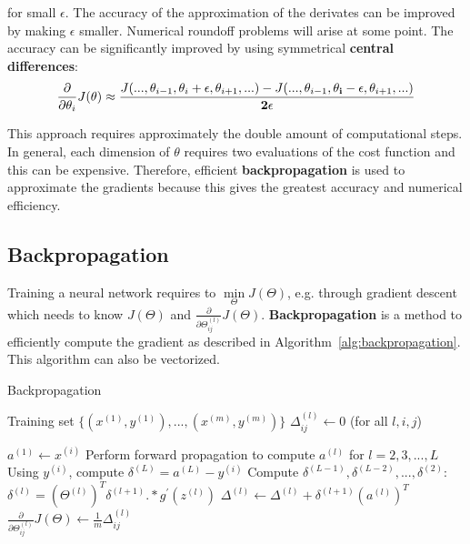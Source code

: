 \documentclass{report}
\begin{document}
for small $\epsilon$. The accuracy of the approximation of the derivates can be improved by making $\epsilon$ smaller.
Numerical roundoff problems will arise at some point.
The accuracy can be significantly improved by using symmetrical {\bf central differences}:
\begin{align*}
\frac{\partial}{\partial\theta_i}J(\theta)\approx\frac{J(...,\theta_{i-1},\theta_{i}+\epsilon,\theta_{i+1},...)-J(...,\theta_{i-1},{\bf \theta_{i}-\epsilon},\theta_{i+1},...)}{{\bf 2}\epsilon}
\end{align*}

This approach requires approximately the double amount of computational steps.
In general, each dimension of $\theta$ requires two evaluations of the cost function and this can be expensive.
Therefore, efficient {\bf backpropagation} is used to approximate the gradients because this gives the greatest accuracy and numerical efficiency.


\subsection{Backpropagation}
Training a neural network requires to $\min\limits_{\Theta}J(\Theta)$, e.g. through gradient descent which needs to know $J(\Theta)$ and $\frac{\partial}{\partial \Theta_{ij}^{(l)}}J(\Theta)$.
{\bf Backpropagation} is a method to efficiently compute the gradient as described in Algorithm~\ref{alg:backpropagation}. This algorithm can also be vectorized.

\begin{algorithm}[h!]
\caption{Backpropagation}
\label{alg:backpropagation}
\begin{algorithmic}
\State Training set $\{(x^{(1)},y^{(1)}),...,(x^{(m)},y^{(m)})\}$
\State $\Delta_{ij}^{(l)} \gets 0$ (for all $l,i,j$)

\State $a^{(1)} \gets x^{(i)}$
\State Perform forward propagation to compute $a^{(l)}$ for $l=2,3,...,L$
\State Using $y^{(i)}$, compute $\delta^{(L)}=a^{(L)}-y^{(i)}$ 
\State Compute $\delta^{(L-1)},\delta^{(L-2)},...,\delta^{(2)}$: $\delta^{(l)}=(\Theta^{(l)})^T\delta^{(l+1)}.*g^{'}(z^{(l)})$
\State $\Delta^{(l)} \gets \Delta^{(l)}+\delta^{(l+1)}(a^{(l)})^T$  
\EndFor
\State $\frac{\partial}{\partial \Theta_{ij}^{(l)}}J(\Theta) \gets \frac{1}{m}\Delta_{ij}^{(l)}$

\end{algorithmic}
\end{algorithm}
\end{document}
